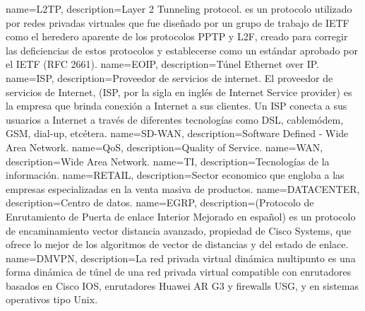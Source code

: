  {
	name={L2TP}, 
	description={Layer 2 Tunneling protocol. es un protocolo utilizado por redes privadas virtuales que fue diseñado por un grupo de trabajo de IETF como el heredero aparente de los protocolos PPTP y L2F, creado para corregir las deficiencias de estos protocolos y establecerse como un estándar aprobado por el IETF (RFC 2661).}
}
 {
	name={EOIP}, 
	description={Túnel Ethernet over IP.}
}
 {
	name={ISP}, 
	description={Proveedor de servicios de internet. El proveedor de servicios de Internet, (ISP, por la sigla en inglés de Internet Service provider) es la empresa que brinda conexión a Internet a sus clientes. Un ISP conecta a sus usuarios a Internet a través de diferentes tecnologías como DSL, cablemódem, GSM, dial-up, etcétera.}
}
 {
	name={SD-WAN}, 
	description={Software Defined - Wide Area Network.}
}
 {
	name={QoS}, 
	description={Quality of Service.}
}
 {
	name={WAN}, 
	description={Wide Area Network.}
}
 {
	name={TI}, 
	description={Tecnologías de la información.}
}
 {
	name={RETAIL}, 
	description={Sector economico que engloba a las empresas especializadas en la venta masiva de productos.}
}
 {
	name={DATACENTER}, 
	description={Centro de datos.}
}
 {
	name={EGRP}, 
	description={(Protocolo de Enrutamiento de Puerta de enlace Interior Mejorado en español) es un protocolo de encaminamiento vector distancia avanzado, propiedad de Cisco Systems, que ofrece lo mejor de los algoritmos de vector de distancias y del estado de enlace.}
}
 {
	name={DMVPN}, 
	description={La red privada virtual dinámica multipunto es una forma dinámica de túnel de una red privada virtual compatible con enrutadores basados en Cisco IOS, enrutadores Huawei AR G3 y firewalls USG, y en sistemas operativos tipo Unix.}
}
